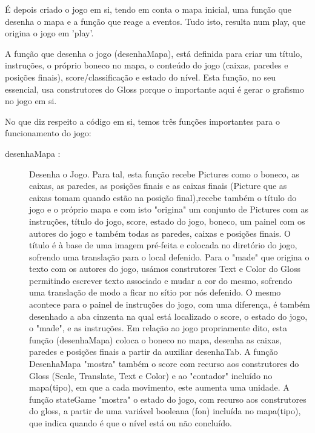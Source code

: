 \documentclass[a4paper]{article}
\begin{document}
É depois criado o jogo em si, tendo em conta o mapa inicial, uma função que desenha o mapa e a função que reage a eventos. Tudo isto, resulta num play, que origina o jogo em 'play'. 

A função que desenha o jogo (desenhaMapa), está definida para criar um título, instruções, o próprio boneco no mapa, o conteúdo do jogo (caixas, paredes e posições finais), score/classificação e estado do nível. Esta função, no seu essencial, usa construtores do Gloss porque o importante aqui é gerar o grafismo no jogo em si.

No que diz respeito a código em si, temos três funções importantes para o funcionamento do jogo:

\begin{description}
  \item[desenhaMapa :] Desenha o Jogo. Para tal, esta função recebe Pictures como o boneco, as caixas, as paredes, as posições finais e as caixas finais (Picture que as caixas tomam quando estão na posição final),recebe também o título do jogo e o próprio mapa e com isto "origina" um conjunto de Pictures com as instruções, título do jogo, score, estado do jogo, boneco, um painel com os autores do jogo e também todas as paredes, caixas e posições finais.
  O título é à base de uma imagem pré-feita e colocada no diretório do jogo, sofrendo uma translação para o local defenido. Para o "made" que origina o texto com os autores do jogo, usámos construtores Text e Color do Gloss permitindo escrever texto associado e mudar a cor do mesmo, sofrendo uma translação de modo a ficar no sítio por nós defenido. O mesmo acontece para o painel de instruções do jogo, com uma diferença, é também desenhado a aba cinzenta na qual está localizado o score, o estado do jogo, o "made", e as instruções.
  Em relação ao jogo propriamente dito, esta função (desenhaMapa) coloca o boneco no mapa, desenha as caixas, paredes e posições finais a partir da auxiliar desenhaTab.
  A função DesenhaMapa "mostra" também o score com recurso aos construtores do Gloss (Scale, Translate, Text e Color) e ao "contador" incluído no mapa(tipo), em que a cada movimento, este aumenta uma unidade. 
  A função stateGame "mostra" o estado do jogo, com recurso aos construtores do gloss, a partir de uma variável booleana (fon) incluída no mapa(tipo), que indica quando é que o nível está ou não concluído.
  

\end{description}
\end{document}
